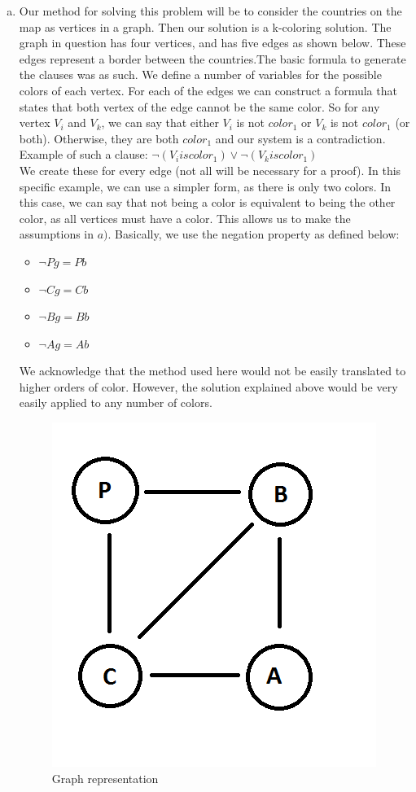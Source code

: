 \documentclass[fullpage]{article}
\begin{document}
\begin{enumerate}[(a)]
\item Our method for solving this problem will be to consider the countries on the map as vertices in a graph. Then our solution is a k-coloring solution. The graph in question has four vertices, and has five edges as shown below. These edges represent a border between the countries.The basic formula to generate the clauses was as such. We define a number of variables for the possible colors of each vertex. For each of the edges we can construct a formula that states that both vertex of the edge cannot be the same color. So for any vertex $V_i$ and $V_k$, we can say that either $V_i$ is not $color_1$ or $V_k$ is not $color_1$ (or both). Otherwise, they are both $color_1$ and our system is a contradiction. Example of such a clause:
${\neg (V_i is color_1) \vee \neg (V_k is color_1)}$\\

We create these for every edge (not all will be necessary for a proof). In this specific example, we can use a simpler form, as there is only two colors. In this case, we can say that not being a color is equivalent to being the other color, as all vertices must have a color. This allows us to make the assumptions in $a)$. Basically, we use the negation property as defined below:
\begin{itemize}
\item[] ${\neg Pg = Pb}$
\item[] ${\neg Cg = Cb}$
\item[] ${\neg Bg = Bb}$
\item[] ${\neg Ag = Ab}$
\end{itemize}

We acknowledge that the method used here would not be easily translated to higher orders of color. However, the solution explained above would be very easily applied to any number of colors.
\begin{figure}[h!]
\centering
\includegraphics[scale=0.4]{graph}
\caption{Graph representation}
\label{fig:method}
\end{figure}


\end{enumerate}
\end{document}
